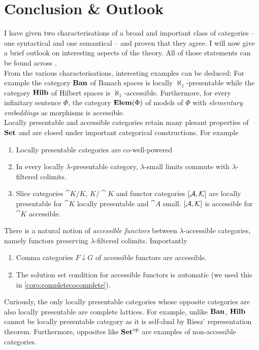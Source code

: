 \section{Conclusion \& Outlook}
\label{sec:conclusion}

I have given two characterisations of a broad and important class of categories -- one syntactical and one semantical -- and proven that they agree. I will now give a brief outlook on interesting aspects of the theory. All of those statements can be found across \cite{AdamekRosicky}. \\

From the various characterisations, interesting examples can be deduced: For example the category $\mathbf{Ban}$ of Banach spaces is locally $\aleph_1$-presentable while the category $\mathbf{Hilb}$ of Hilbert spaces is $\aleph_1$-accessible. Furthermore, for every infinitary sentence $\Phi$, the category $\mathbf{Elem}(\Phi)$ of models of $\Phi$ with \emph{elementary embeddings} as morphisms is accessible. \\

Locally presentable and accessible categories retain many plesant properties of $\mathbf{Set}$ and are closed under important categorical constructions. For example
\begin{enumerate}
\item Locally presentable categories are co-well-powered
\item In every locally $\lambda$-presentable category, $\lambda$-small limits commute with $\lambda$-filtered colimits.
\item Slice categories $\cat K/K$, $K/\cat K$ and functor categories $[\mathcal{A},\mathcal{K}]$ are locally presentable for $\cat K$ locally presentable and $\cat A$ small. $[\mathcal{A},\mathcal{K}]$ is accessible for $\cat K$ accessible.
\end{enumerate}
There is a natural notion of \emph{accessible functors} between $\lambda$-accessible categories, namely functors preserving $\lambda$-filtered colimits. Importantly
\begin{enumerate}[resume]
\item Comma categories $F \downarrow G$ of accessible functors are accessible.
\item The solution set condition for accessible functors is automatic (we used this in \ref{coro:completecocomplete}).
\end{enumerate}
Curiously, the only locally presentable categories whose opposite categories are also locally presentable are complete lattices. For example, unlike $\mathbf{Ban}$, $\mathbf{Hilb}$ cannot be locally presentable category as it is self-dual by Riesz' representation theorem. Furthermore, opposites like $\mathbf{Set}^{\textrm{op}}$ are examples of non-accessible categories. \\

